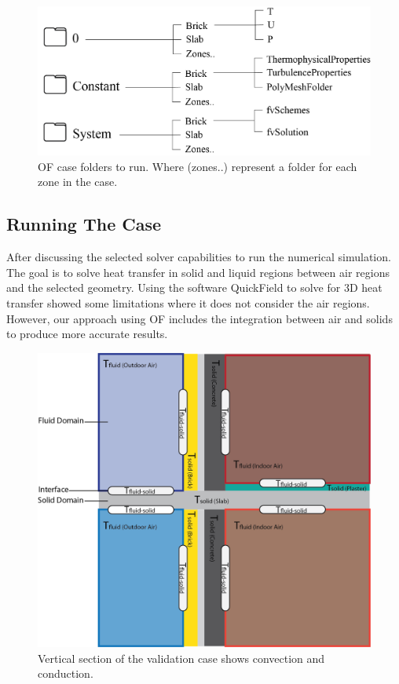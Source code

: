 \begin{figure}[tb]
\centering
\includegraphics[width=0.77\columnwidth]{Figures/constc.png}
\hspace{0.7cm}
\caption[OF Case Contents]{OF case folders to run. Where (zones..) represent a folder for each zone in the case.}
\label{constc}
\end{figure}





\subsection{Running The Case}    
 
After discussing the selected solver capabilities to run the numerical simulation. The goal is to solve heat transfer in solid and liquid regions between air regions and the selected geometry. Using the software QuickField to solve for 3D heat transfer showed some limitations where it does not consider the air regions. However, our approach using  \gls{OF} includes the integration between air and solids to produce more accurate results. 

\begin{figure}[tbh] 
\includegraphics[width=0.77\columnwidth]{Figures/conductive.png}
\hspace{0.7cm}
\caption[3D Interfaces]{Vertical section of the validation case shows convection and conduction.}
\label{interface}
\end{figure}

